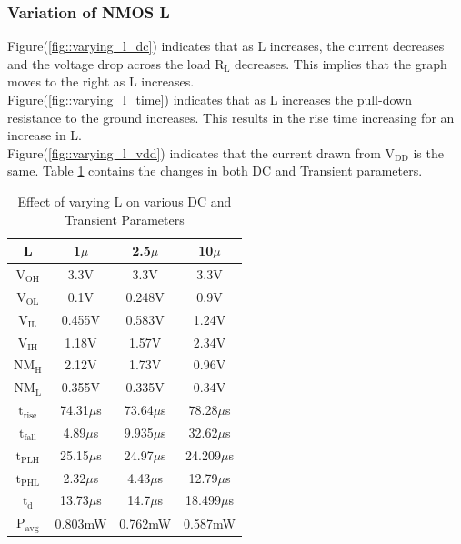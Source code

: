 \documentclass[12pt, a4paper]{article}
\begin{document}
	\subsubsection{Variation of NMOS L}
	Figure(\ref{fig::varying_l_dc}) indicates that as L increases, the current decreases and the voltage drop across the load $\text{R}_\text{L}$ decreases. This implies that the graph moves to the right as L increases.\\
	Figure(\ref{fig::varying_l_time}) indicates that as L increases the pull-down resistance to the ground increases. This results in the rise time increasing for an increase in L.\\
	Figure(\ref{fig::varying_l_vdd}) indicates that the current drawn from $\text{V}_{\text{DD}}$ is the same. Table \ref{table::tablevaryl} contains the changes in both DC and Transient parameters.
	\begin{table}[H]
		\begin{center}
			\begin{tabular}{|c|c|c|c|}
				\hline 
				\rule[-1ex]{0pt}{2.5ex} L & 1$\mu$ & 2.5$\mu$ & 10$\mu$  \\ 
				\hline 
				\rule[-1ex]{0pt}{2.5ex} $\text{V}_\text{OH}$ & 3.3V & 3.3V & 3.3V \\ 
				$\text{V}_\text{OL}$ & 0.1V & 0.248V & 0.9V \\ 
				$\text{V}_\text{IL}$ & 0.455V & 0.583V & 1.24V \\ 
				$\text{V}_\text{IH}$ & 1.18V & 1.57V & 2.34V \\ 
				$\text{NM}_\text{H}$ & 2.12V & 1.73V & 0.96V \\ 
				$\text{NM}_\text{L}$ & 0.355V & 0.335V & 0.34V \\ 
				$\text{t}_\text{rise}$ & 74.31$\mu$s & 73.64$\mu$s & 78.28$\mu$s \\ 
				$\text{t}_\text{fall}$ & 4.89$\mu$s & 9.935$\mu$s & 32.62$\mu$s \\ 
				$\text{t}_\text{PLH}$ & 25.15$\mu$s & 24.97$\mu$s & 24.209$\mu$s \\ 
				$\text{t}_\text{PHL}$ & 2.32$\mu$s & 4.43$\mu$s & 12.79$\mu$s \\ 
				$\text{t}_\text{d}$ & 13.73$\mu$s & 14.7$\mu$s & 18.499$\mu$s \\ 
				$\text{P}_\text{avg}$ & 0.803mW  & 0.762mW & 0.587mW \\ 
				\hline 
			\end{tabular} 
		\end{center}
		\caption{Effect of varying L on various DC and Transient Parameters}
		\label{table::tablevaryl}
	\end{table}
\end{document}
